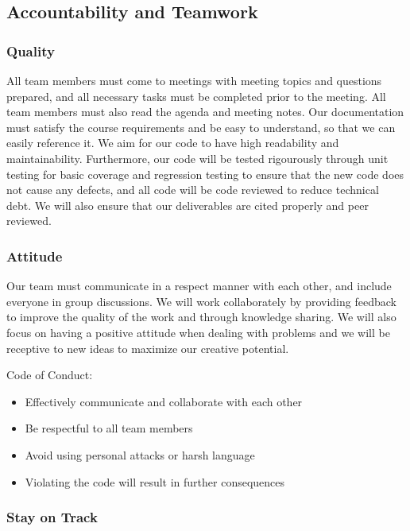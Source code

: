 \documentclass{article}
\begin{document}
\subsection*{Accountability and Teamwork}

\subsubsection*{Quality} 

All team members must come to meetings with meeting topics and questions prepared, and all necessary tasks must be completed prior to the meeting. All team members must also read the agenda and meeting notes. 
Our documentation must satisfy the course requirements and be easy to understand, so that we can easily reference it. We aim for our code to have high readability and maintainability. Furthermore, our code 
will be tested rigourously through unit testing for basic coverage and regression testing to ensure that the new code does not cause any defects, and all code will be code reviewed to reduce technical debt.
We will also ensure that our deliverables are cited properly and peer reviewed.

\subsubsection*{Attitude}

Our team must communicate in a respect manner with each other, and include everyone in group discussions. We will work collaborately by providing feedback to improve the quality of the work and through 
knowledge sharing. We will also focus on having a positive attitude when dealing with problems and we will be receptive to new ideas to maximize our creative potential.


Code of Conduct: 
\begin{itemize}
    \item Effectively communicate and collaborate with each other
    \item Be respectful to all team members
    \item Avoid using personal attacks or harsh language
    \item Violating the code will result in further consequences
\end{itemize}

\subsubsection*{Stay on Track}
\end{document}
